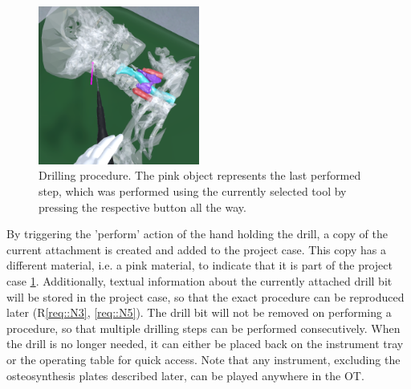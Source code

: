 \begin{figure}[ht]
    \centering
    \includegraphics[width=200px]{images/implementation/features/procedures/drilling.png}
    \caption{\label{fig::FeatureDrilling}Drilling procedure. The pink object represents the last performed step, which was performed using the currently selected tool by pressing the respective button all the way.}
\end{figure}

By triggering the 'perform' action of the hand holding the drill, a copy of the current attachment is created and added to the project case. 
This copy has a different material, i.e. a pink material, to indicate that it is part of the project case \ref{fig::FeatureDrilling}.
Additionally, textual information about the currently attached drill bit will be stored in the project case, so that the exact procedure can be reproduced later (R\ref{req::N3}, \ref{req::N5}).
The drill bit will not be removed on performing a procedure, so that multiple drilling steps can be performed consecutively.
When the drill is no longer needed, it can either be placed back on the instrument tray or the operating table for quick access.
Note that any instrument, excluding the osteosynthesis plates described later, can be played anywhere in the OT.